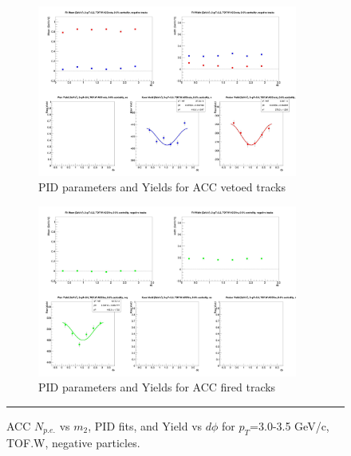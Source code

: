\begin{figure}[H]
  \ContinuedFloat
    \begin{subfigure}{1\textwidth}
   \centering
   \includegraphics[width=0.94\textwidth]{hiptfits/neg/fitParams_tof2_cent0_ch0_pT-30-35.jpg}
    \caption{PID parameters and Yields for ACC vetoed tracks}
    \end{subfigure}    
    \begin{subfigure}{1\textwidth}
   \centering
   \includegraphics[width=0.94\textwidth]{hiptfits/neg/fitParams_tof3_cent0_ch0_pT-30-35.jpg}
    \caption{PID parameters and Yields for ACC fired tracks}
    \end{subfigure} 
    \rule{35em}{0.5pt}
  \caption[ACC $N_{p.e.}$ vs $m_2$, PID fits, and Yield vs $d\phi$ for $p_T$=3.0-3.5 GeV/c, TOF.W, negative particles.]{ACC $N_{p.e.}$ vs $m_2$, PID fits, and Yield vs $d\phi$ for $p_T$=3.0-3.5 GeV/c, TOF.W, negative particles.}
  \label{fig:acc30-35neg}
\end{figure}

